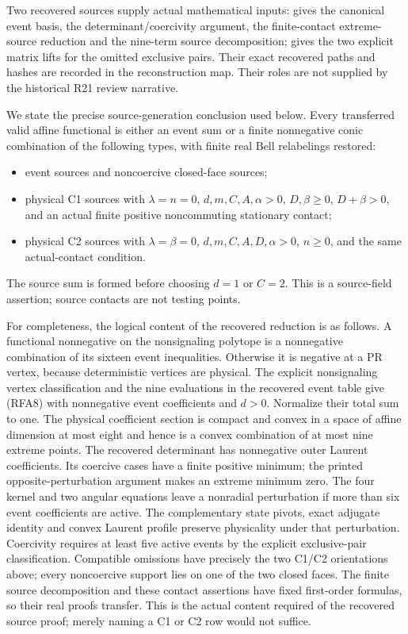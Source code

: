 Two recovered sources supply actual mathematical inputs:
 gives the canonical event basis, the
determinant/coercivity argument, the finite-contact extreme-source
reduction and the nine-term source decomposition;
 gives the two explicit matrix lifts
for the omitted exclusive pairs. Their exact recovered paths and hashes
are recorded in the reconstruction map. Their roles are not supplied
by the historical R21 review narrative.

We state the precise source-generation conclusion used below. Every
transferred valid affine functional is either an event sum or a finite
nonnegative conic combination of the following types, with finite real
Bell relabelings restored:
\begin{itemize}
\item event sources and noncoercive closed-face sources;
\item physical C1 sources with $\lambda=n=0$, $d,m,C,A,\alpha>0$,
      $D,\beta\geq0$, $D+\beta>0$, and an actual finite positive
      noncommuting stationary contact;
\item physical C2 sources with $\lambda=\beta=0$,
      $d,m,C,A,D,\alpha>0$, $n\geq0$, and the same actual-contact
      condition.
\end{itemize}
The source sum is formed before choosing $d=1$ or $C=2$.
This is a source-field assertion; source contacts are not testing points.

For completeness, the logical content of the recovered reduction is as
follows. A functional nonnegative on the nonsignaling polytope is a
nonnegative combination of its sixteen event inequalities. Otherwise it
is negative at a PR vertex, because deterministic vertices are physical.
The explicit nonsignaling vertex classification and the nine evaluations
in the recovered event table give (RFA8) with nonnegative event
coefficients and $d>0$. Normalize their total sum to one. The physical
coefficient section is compact and convex in a space of affine dimension
at most eight and hence is a convex combination of at most nine extreme
points. The recovered determinant has nonnegative outer Laurent
coefficients. Its coercive cases have a finite positive minimum; the
printed opposite-perturbation argument makes an extreme minimum zero.
The four kernel and two angular equations leave a nonradial perturbation
if more than six event coefficients are active. The complementary state
pivots, exact adjugate identity and convex Laurent profile preserve
physicality under that perturbation. Coercivity requires at least five
active events by the explicit exclusive-pair classification. Compatible
omissions have precisely the two C1/C2 orientations above; every
noncoercive support lies on one of the two closed faces. The finite
source decomposition and these contact assertions have fixed first-order
formulas, so their real proofs transfer. This is the actual content
required of the recovered source proof; merely naming a C1 or C2 row
would not suffice.

